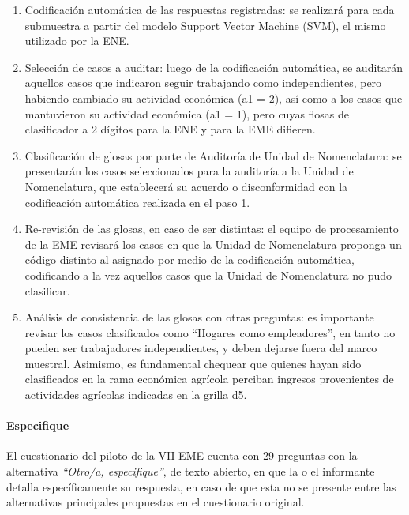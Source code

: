 \documentclass[
]{article}
\providecommand{\tightlist}{%
  \setlength{\itemsep}{0pt}\setlength{\parskip}{0pt}}
\begin{document}
\begin{enumerate}
\def\labelenumi{\arabic{enumi}.}
\tightlist
\item
  Codificación automática de las respuestas registradas: se realizará para cada submuestra a partir del modelo Support Vector Machine (SVM), el mismo utilizado por la ENE.
\item
  Selección de casos a auditar: luego de la codificación automática, se auditarán aquellos casos que indicaron seguir trabajando como independientes, pero habiendo cambiado su actividad económica (a1 = 2), así como a los casos que mantuvieron su actividad económica (a1 = 1), pero cuyas flosas de clasificador a 2 dígitos para la ENE y para la EME difieren.
\item
  Clasificación de glosas por parte de Auditoría de Unidad de Nomenclatura: se presentarán los casos seleccionados para la auditoría a la Unidad de Nomenclatura, que establecerá su acuerdo o disconformidad con la codificación automática realizada en el paso 1.\\
\item
  Re-revisión de las glosas, en caso de ser distintas: el equipo de procesamiento de la EME revisará los casos en que la Unidad de Nomenclatura proponga un código distinto al asignado por medio de la codificación automática, codificando a la vez aquellos casos que la Unidad de Nomenclatura no pudo clasificar.
\item
  Análisis de consistencia de las glosas con otras preguntas: es importante revisar los casos clasificados como ``Hogares como empleadores'', en tanto no pueden ser trabajadores independientes, y deben dejarse fuera del marco muestral. Asimismo, es fundamental chequear que quienes hayan sido clasificados en la rama económica agrícola perciban ingresos provenientes de actividades agrícolas indicadas en la grilla d5.
\end{enumerate}

\hypertarget{especifique}{%
\paragraph{Especifique}\label{especifique}}

El cuestionario del piloto de la VII EME cuenta con 29 preguntas con la alternativa \emph{``Otro/a, especifique''}, de texto abierto, en que la o el informante detalla específicamente su respuesta, en caso de que esta no se presente entre las alternativas principales propuestas en el cuestionario original.
\end{document}
